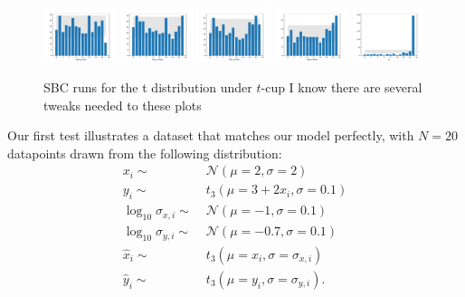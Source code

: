\documentclass[fleqn,usenatbib]{mnras}
\begin{document}
\begin{figure}
    \includegraphics[width=0.19\textwidth]{graphics/sbc_t/alpha_scaled.pdf}
    \includegraphics[width=0.19\textwidth]{graphics/sbc_t/beta_scaled.0.pdf}
    \includegraphics[width=0.19\textwidth]{graphics/sbc_t/beta_scaled.1.pdf}
    \includegraphics[width=0.19\textwidth]{graphics/sbc_t/sigma_scaled.pdf}
    \includegraphics[width=0.19\textwidth]{graphics/sbc_t/nu.pdf}
    \caption{SBC runs for the t distribution under $t$-cup {\color{red} I know
    there are several tweaks needed to these plots}}
    \label{fig:results.t.sbc}
\end{figure}

Our first test illustrates a dataset that matches our model perfectly, with $N =
20$ datapoints drawn from the following distribution:
\begin{align}
    x_i \sim&\; \mathcal N (\mu = 2, \sigma = 2) \\
    y_i \sim&\; t_{3} (\mu = 3 + 2 x_i, \sigma = 0.1) \\
    \log_{10} \sigma_{x, i} \sim&\; \mathcal N (\mu = -1, \sigma = 0.1) \\
    \log_{10} \sigma_{y, i} \sim&\; \mathcal N (\mu = -0.7, \sigma = 0.1) \\
    \hat{x}_i \sim&\; t_{3} (\mu = x_i, \sigma = \sigma_{x, i}) \\
    \hat{y}_i \sim&\; t_{3} (\mu = y_i, \sigma = \sigma_{y, i}).
\end{align}
\end{document}
